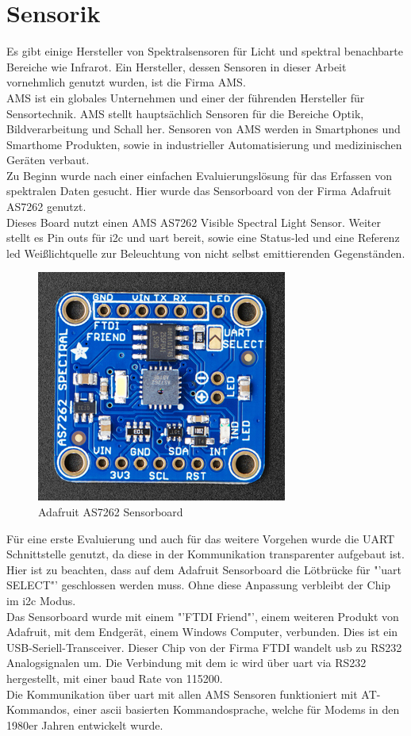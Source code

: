 \documentclass[11pt]{scrartcl}
\begin{document}
\section{Sensorik}
Es gibt einige Hersteller von Spektralsensoren für Licht und spektral benachbarte Bereiche wie Infrarot.
Ein Hersteller, dessen Sensoren in dieser Arbeit vornehmlich genutzt wurden, ist die Firma AMS.\\
AMS ist ein globales Unternehmen und einer der führenden Hersteller für Sensortechnik. AMS stellt hauptsächlich Sensoren für die Bereiche
Optik, Bildverarbeitung und Schall her. Sensoren von AMS werden in Smartphones und Smarthome Produkten, sowie in industrieller
Automatisierung und medizinischen Geräten verbaut. \cite{ams}\\
Zu Beginn wurde nach einer einfachen Evaluierungslösung für das Erfassen von spektralen Daten gesucht. Hier wurde das
Sensorboard von der Firma Adafruit AS7262 genutzt. \cite{adafruit}\\
Dieses Board nutzt einen AMS AS7262 Visible Spectral Light Sensor. Weiter stellt es Pin outs für \ac{i2c} und \ac{uart} bereit,
sowie eine Status-\ac{led} und eine Referenz \ac{led} Weißlichtquelle zur Beleuchtung von nicht selbst emittierenden Gegenständen.
\begin{figure}[H]
    \begin{center}
        \includegraphics[width=.48\textwidth]{images/AS7262_front.png}
    \end{center}
    \caption[Adafruit AS7262 Sensorboard]{Adafruit AS7262 Sensorboard \cite{adafruit}}
\end{figure}
\noindent
Für eine erste Evaluierung und auch für das weitere Vorgehen wurde die UART Schnittstelle genutzt, da diese in der Kommunikation
transparenter aufgebaut ist.\\
Hier ist zu beachten, dass auf dem Adafruit Sensorboard die Lötbrücke für "'\ac{uart} SELECT"' geschlossen werden muss. Ohne diese
Anpassung verbleibt der Chip im \ac{i2c} Modus.\\
Das Sensorboard wurde mit einem "'FTDI Friend"', einem weiteren Produkt von Adafruit, mit dem Endgerät, einem Windows Computer, verbunden.
Dies ist ein USB-Seriell-Transceiver. Dieser Chip von der Firma FTDI wandelt \ac{usb} zu RS232 Analogsignalen um. Die Verbindung mit dem
\ac{ic} wird über \ac{uart} via RS232 hergestellt, mit einer \ac{baud} Rate von 115200.\\
Die Kommunikation über \ac{uart} mit allen AMS Sensoren funktioniert mit AT-Kommandos, einer \ac{ascii} basierten Kommandosprache,
welche für Modems in den 1980er Jahren entwickelt wurde.
\end{document}
